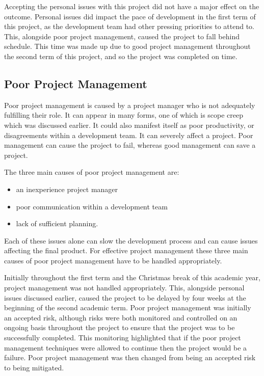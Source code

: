 \documentclass{article}
\begin{document}
Accepting the personal issues with this project did not have a major effect on the outcome. Personal issues did impact the pace of development in the first term of this project, as the development team had other pressing priorities to attend to. This, alongside poor project management, caused the project to fall behind schedule. This time was made up due to good project management throughout the second term of this project, and so the project was completed on time. \par

\subsection{Poor Project Management}

Poor project management is caused by a project manager who is not adequately fulfilling their role. It can appear in many forms, one of which is scope creep which was discussed earlier. It could also manifest itself as poor productivity, or disagreements within a development team. It can severely affect a project. Poor management can cause the project to fail, whereas good management can save a project. \par

The three main causes of poor project management are:

\begin{itemize}
	\item an inexperience project manager
	\item poor communication within a development team
	\item lack of sufficient planning.
\end{itemize}

Each of these issues alone can slow the development process and can cause issues affecting the final product. For effective project management these three main causes of poor project management have to be handled appropriately. \par

Initially throughout the first term and the Christmas break of this academic year, project management was not handled appropriately. This, alongside personal issues discussed earlier, caused the project to be delayed by four weeks at the beginning of the second academic term. Poor project management was initially an accepted risk, although risks were both monitored and controlled on an ongoing basis throughout the project to ensure that the project was to be successfully completed. This monitoring highlighted that if the poor project management techniques were allowed to continue then the project would be a failure. Poor project management was then changed from being an accepted risk to being mitigated. \par
\end{document}
